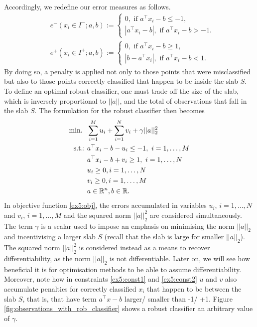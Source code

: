 Accordingly, we redefine our error measures as follows. 
%
\begin{align*}
	& e^-(x_i \in I^-; a, b) := 
	    \begin{cases} 0, \text{ if } a^\top x_i - b \leq -1, \\
	        |a^\top x_i - b|, \text{ if } a^\top x_i - b > -1.
	    \end{cases} \\
	& e^+(x_i \in I^+; a, b) := 
	    \begin{cases} 0, \text{ if } a^\top x_i - b \geq 1, \\
	        |b -  a^\top x_i|, \text{ if } a^\top x_i - b < 1.
	    \end{cases}                   
\end{align*}
%
By doing so, a penalty is applied not only to those points that were misclassified but also to those points correctly classified that happen to be inside the slab $S$. To define an optimal robust classifier, one must trade off the size of the slab, which is inversely proportional to $||a||$, and the total of observations that fall in the slab $S$. The formulation for the robust classifier then becomes
%
\begin{align}
	\mathop{\text{min.~}} \ & \sum_{i=1}^M u_i + \sum_{i=1}^N v_i + \gamma||a||_2^2 \label{ex5:obj}\\
	\mathop{\text{s.t.:~}} & a^\top x_i - b - u_i \leq -1, \ i = 1,\dots,M \label{ex5:const1} \\
	    & a^\top x_i - b + v_i \geq 1, \ i = 1,\dots,N \label{ex5:const2} \\
	    & u_i \geq 0, i = 1, \dots, N \\
	    & v_i \geq 0, i = 1, \dots, M \\
	    & a \in \mathbb{R}^n, b \in \mathbb{R}.
\end{align} 
%  
In objective function \eqref{ex5:obj}, the errors accumulated in variables $u_i$, $i=1,\dots,N$ and $v_i$, $i = 1,\dots,M$ and the squared norm $||a||_2^2$ are considered simultaneously. The term $\gamma$ is a scalar used to impose an emphasis on minimising the norm $||a||_2$ and incentivising a larger slab $S$ (recall that the slab is large for smaller $||a||_2$). The squared norm  $||a||_2^2$ is considered instead as a means to recover differentiability, as the norm  $||a||_2$ is not differentiable. Later on, we will see how beneficial it is for optimisation methods to be able to assume differentiability. Moreover, note how in constraints \eqref{ex5:const1} and \eqref{ex5:const2} $u$ and $v$ also accumulate penalties for correctly classified $x_i$ that happen to be between the slab $S$, that is, that have term $a^\top x - b$ larger/ smaller than -1/ +1. Figure \ref{fig:observations_with_rob_classifier} shows a robust classifier an arbitrary value of $\gamma$.

